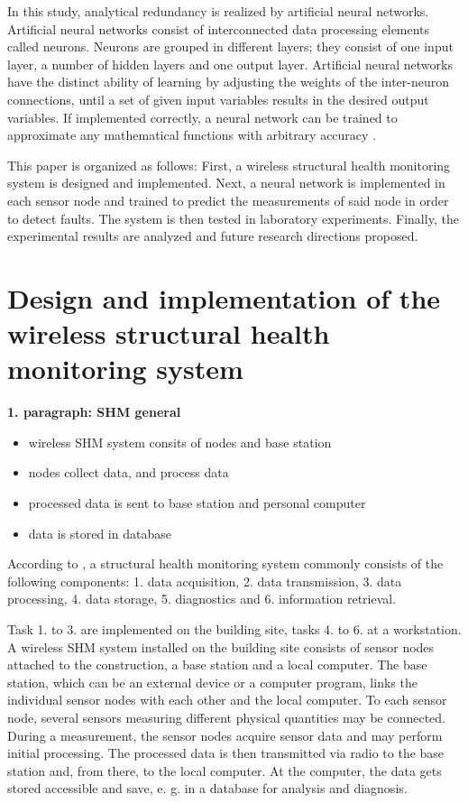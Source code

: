 \documentclass[12pt]{scrartcl}
\begin{document}
In this study, analytical redundancy is realized by artificial neural networks.
Artificial neural networks consist of interconnected data processing elements called neurons. 
Neurons are grouped in different layers; they consist of one input layer, a number of hidden layers and one output layer.
Artificial neural networks have the distinct ability of learning by adjusting the weights of the inter-neuron connections, until a set of given input variables results in the desired output variables.
If implemented correctly, a neural network can be trained to approximate any mathematical functions with arbitrary accuracy \citep{Li2011}.

This paper is organized as follows:
First, a wireless structural health monitoring system is designed and implemented. 
Next, a neural network is implemented in each sensor node and trained to predict the measurements of said node in order to detect faults. 
The system is then tested in laboratory experiments. 
Finally, the experimental results are analyzed and future research directions proposed.


\newpage

\section*{Design and implementation of the wireless structural health monitoring system}

\textbf{1. paragraph: SHM general}

\begin{itemize}
\item wireless SHM system consits of nodes and base station
\item nodes collect data, and process data
\item processed data is sent to base station and personal computer
\item data is stored in database
\end{itemize}


According to \cite[5]{BisbySHM}, a structural health monitoring system commonly consists of the following components:
1. data acquisition,
2. data transmission, 
3. data processing,
4. data storage,
5. diagnostics and 
6. information retrieval.

Task 1. to 3. are implemented on the building site, tasks 4. to 6. at a workstation. 
A wireless SHM system installed on the building site consists of sensor nodes attached to the construction, a base station and a local computer. 
The base station, which can be an external device or a computer program, links the individual sensor nodes with each other and the local computer.
To each sensor node, several sensors measuring different physical quantities may be connected. 
During a measurement, the sensor nodes acquire sensor data and may perform initial processing.
The processed data is then transmitted via radio to the base station and, from there, to the local computer. 
At the computer, the data gets stored accessible and save, e. g. in a database for analysis and diagnosis.
\end{document}
